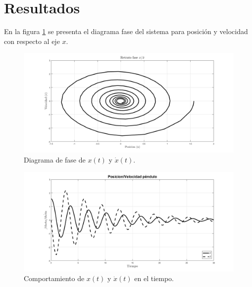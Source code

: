 \section{Resultados}
En la figura \ref{fig: phase plot x} 
se presenta el diagrama fase del sistema para
posición y velocidad con respecto al eje $x$.

\begin{figure}[hb]
 \centering 
 \includegraphics[scale=0.15]{./img/fasependulox2.png}
 \caption{Diagrama de fase de $x(t)$ y $\dot{x}(t)$.}
 \label{fig: phase plot x}
\end{figure}



\begin{figure}[hb]
 \centering 
 \includegraphics[scale=0.15]{./img/posvelpendulo2.png}
 \caption{Comportamiento de $x(t)$ y $\dot{x}(t)$ en el tiempo.}
 \label{fig: time plot x dx}
\end{figure}


